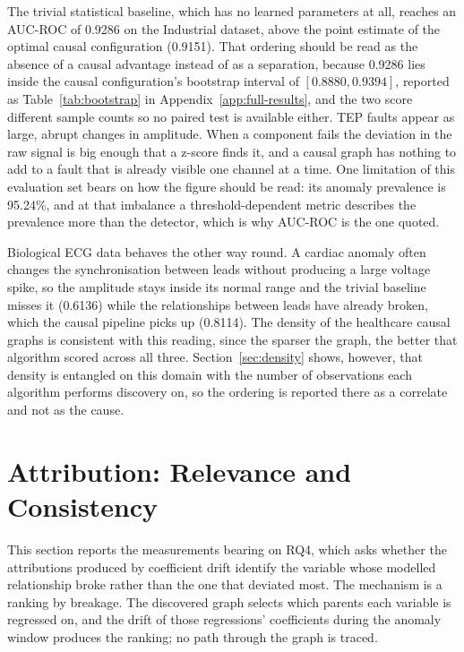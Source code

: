 The trivial statistical baseline, which has no learned parameters at all, reaches an AUC-ROC of 0.9286 on the Industrial dataset, above the point estimate of the optimal causal configuration (0.9151). That ordering should be read as the absence of a causal advantage instead of as a separation, because 0.9286 lies inside the causal configuration's bootstrap interval of $[0.8880, 0.9394]$, reported as Table~\ref{tab:bootstrap} in Appendix~\ref{app:full-results}, and the two score different sample counts so no paired test is available either. TEP faults appear as large, abrupt changes in amplitude. When a component fails the deviation in the raw signal is big enough that a z-score finds it, and a causal graph has nothing to add to a fault that is already visible one channel at a time. One limitation of this evaluation set bears on how the figure should be read: its anomaly prevalence is 95.24\%, and at that imbalance a threshold-dependent metric describes the prevalence more than the detector, which is why AUC-ROC is the one quoted.

Biological ECG data behaves the other way round. A cardiac anomaly often changes the synchronisation between leads without producing a large voltage spike, so the amplitude stays inside its normal range and the trivial baseline misses it (0.6136) while the relationships between leads have already broken, which the causal pipeline picks up (0.8114). The density of the healthcare causal graphs is consistent with this reading, since the sparser the graph, the better that algorithm scored across all three. Section~\ref{sec:density} shows, however, that density is entangled on this domain with the number of observations each algorithm performs discovery on, so the ordering is reported there as a correlate and not as the cause.

\section{Attribution: Relevance and Consistency}
\label{sec:attribution}

This section reports the measurements bearing on RQ4, which asks whether the attributions produced by coefficient drift identify the variable whose modelled relationship broke rather than the one that deviated most. The mechanism is a ranking by breakage. The discovered graph selects which parents each variable is regressed on, and the drift of those regressions' coefficients during the anomaly window produces the ranking; no path through the graph is traced.

